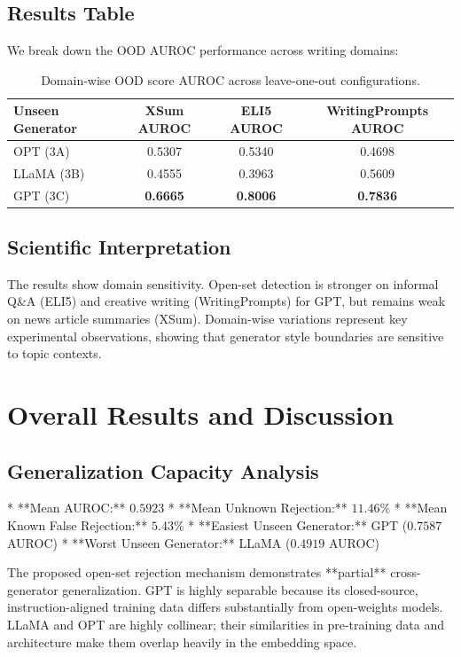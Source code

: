 \documentclass[12pt,a4paper]{report}
\begin{document}
\section{Results Table}
We break down the OOD AUROC performance across writing domains:
\begin{table}[h]
\centering
\begin{tabular}{lccc}
\toprule
\textbf{Unseen Generator} & \textbf{XSum AUROC} & \textbf{ELI5 AUROC} & \textbf{WritingPrompts AUROC} \\
\midrule
OPT (3A) & 0.5307 & 0.5340 & 0.4698 \\
LLaMA (3B) & 0.4555 & 0.3963 & 0.5609 \\
GPT (3C) & \textbf{0.6665} & \textbf{0.8006} & \textbf{0.7836} \\
\bottomrule
\end{tabular}
\caption{Domain-wise OOD score AUROC across leave-one-out configurations.}
\label{tab:domain_auroc}
\end{table}

\section{Scientific Interpretation}
The results show domain sensitivity. Open-set detection is stronger on informal Q\&A (ELI5) and creative writing (WritingPrompts) for GPT, but remains weak on news article summaries (XSum). Domain-wise variations represent key experimental observations, showing that generator style boundaries are sensitive to topic contexts.

\chapter{Overall Results and Discussion}
\label{ch:discussion}

\section{Generalization Capacity Analysis}
*   **Mean AUROC:** $0.5923$
*   **Mean Unknown Rejection:** $11.46\%$
*   **Mean Known False Rejection:** $5.43\%$
*   **Easiest Unseen Generator:** GPT ($0.7587$ AUROC)
*   **Worst Unseen Generator:** LLaMA ($0.4919$ AUROC)

The proposed open-set rejection mechanism demonstrates **partial** cross-generator generalization. GPT is highly separable because its closed-source, instruction-aligned training data differs substantially from open-weights models. LLaMA and OPT are highly collinear; their similarities in pre-training data and architecture make them overlap heavily in the embedding space.
\end{document}
